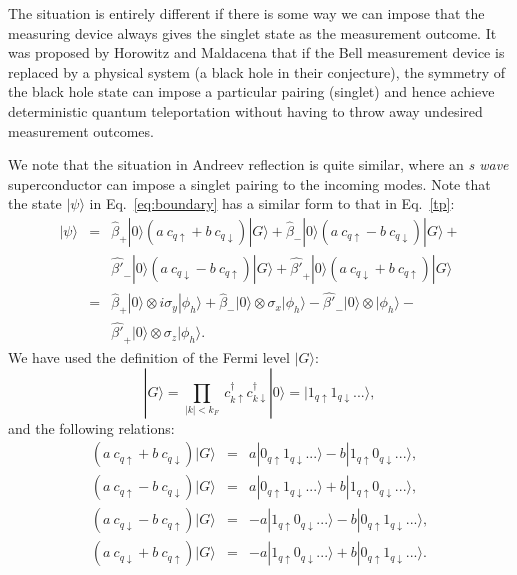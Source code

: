\documentclass[12pt,letterpaper,aps,onecolumn,superscriptaddress,floatfix,notitlepage]{revtex4-1}
\begin{document}
	The situation is entirely different if there is some way we can impose that the measuring device always gives the singlet state as the measurement outcome. It was proposed by Horowitz and Maldacena that if the Bell measurement device is replaced by a physical system (a black hole in their conjecture), the symmetry of the black hole state can impose a particular pairing (singlet) and hence achieve deterministic quantum teleportation without having to throw away undesired measurement outcomes.
	
	We note that the situation in Andreev reflection is quite similar, where an \textit{s wave} superconductor can impose a singlet pairing to the incoming modes. Note that the state $|\psi\rangle$ in Eq.~\eqref{eq:boundary} has a similar form to that in Eq.~\eqref{tp}:
	\begin{eqnarray}
	|\psi\rangle &=&\hat{\beta}_{+}|0\rangle(a~c_{q\uparrow}+b~c_{q\downarrow})|G\rangle+
	\hat{\beta}_{-}|0\rangle(a~c_{q\uparrow}-b~c_{q\downarrow})|G\rangle+\nonumber\\
	&&\hat{\beta'}_{-}|0\rangle(a~c_{q\downarrow}-b~c_{q\uparrow})|G\rangle+
	\hat{\beta'}_{+}|0\rangle(a~c_{q\downarrow}+b~c_{q\uparrow})|G\rangle\nonumber\\
	&=& \hat{\beta}_{+}|0\rangle\otimes i\sigma_{y}|\phi_{h}\rangle + \hat{\beta}_{-}|0\rangle\otimes \sigma_{x}|\phi_{h}\rangle-\hat{\beta'}_{-}|0\rangle\otimes|\phi_{h}\rangle- \nonumber\\
	&&\hat{\beta'}_{+}|0\rangle\otimes\sigma_{z}|\phi_{h}\rangle.
	\end{eqnarray}
	We have used the definition of the Fermi level $|G\rangle:$
	\begin{equation}|G\rangle = \prod_{|k|<k_{F}}~c_{k\uparrow}^{\dagger}c_{k\downarrow}^{\dagger}|0\rangle = |1_{q\uparrow}1_{q\downarrow}...\rangle,\end{equation}
	and the following relations:
	\begin{eqnarray}
	(a~c_{q\uparrow}+b~c_{q\downarrow})|G\rangle &=& a|0_{q\uparrow}1_{q\downarrow}...\rangle-b|1_{q\uparrow}0_{q\downarrow}...\rangle,\\
	(a~c_{q\uparrow}-b~c_{q\downarrow})|G\rangle &=& a|0_{q\uparrow}1_{q\downarrow}...\rangle+b|1_{q\uparrow}0_{q\downarrow}...\rangle,\\
	(a~c_{q\downarrow}-b~c_{q\uparrow})|G\rangle &=& -a|1_{q\uparrow}0_{q\downarrow}...\rangle-b|0_{q\uparrow}1_{q\downarrow}...\rangle,\\
	(a~c_{q\downarrow}+b~c_{q\uparrow})|G\rangle &=& -a|1_{q\uparrow}0_{q\downarrow}...\rangle+b|0_{q\uparrow}1_{q\downarrow}...\rangle.
	\end{eqnarray}
\end{document}
